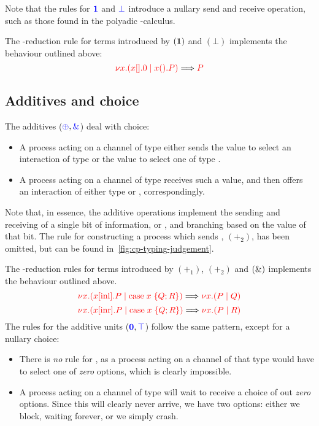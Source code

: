 Note that the rules for $\textcolor{blue}{\mathbf{1}}$ and $\textcolor{blue}{\bot}$ introduce a nullary send and
receive operation, such as those found in the polyadic \textpi-calculus.
\begin{center}
  \cpInfOne
  \cpInfBot
\end{center}
The \textbeta-reduction rule for terms introduced by $(\mathbf{1})$ and $(\bot)$
implements the behaviour outlined above:
\[
  \textcolor{red}{\nu x.(x[].0 \mid x().P)}
  \Longrightarrow
  \textcolor{red}{P}
\]

\subsection{Additives and choice}\label{sec:cp-choice}
The additives ($\textcolor{blue}{\oplus}, \textcolor{blue}{\mathbin{\text{\&}}}$) deal with choice:
\begin{itemize}
\item
  A process acting on a channel of type  either sends the value
   to select an interaction of type  or the value  to
  select one of type .
\item
  A process acting on a channel of type  receives such a value,
  and then offers an interaction of either type  or ,
  correspondingly.
\end{itemize}
Note that, in essence, the additive operations implement the sending and
receiving of a single bit of information,  or , and branching
based on the value of that bit.
The rule for constructing a process which sends , $(\plus_2)$, has been
omitted, but can be found in~\cref{fig:cp-typing-judgement}.
\begin{center}
  \cpInfWith
\end{center}
The \textbeta-reduction rules for terms introduced by $(\plus_1)$, $(\plus_2)$
and $(\mathbin{\text{\&}})$ implements the behaviour outlined above.
\[
  \textcolor{red}{\nu x.(x[\text{inl}].P \mid \text{case}\;x\;\{Q;R\})}
  \Longrightarrow
  \textcolor{red}{\nu x.(P \mid Q)}
\]
\[
  \textcolor{red}{\nu x.(x[\text{inr}].P \mid \text{case}\;x\;\{Q;R\})}
  \Longrightarrow
  \textcolor{red}{\nu x.(P \mid R)}
\]
%
The rules for the additive units ($\textcolor{blue}{\mathbf{0}}, \textcolor{blue}{\top}$) follow the same
pattern, except for a nullary choice:
\begin{itemize}
\item
  There is \emph{no} rule for \ty{\nil}, as a process acting on a channel of
  that type would have to select one of \emph{zero} options, which is clearly
  impossible.
\item
  A process acting on a channel of type \ty{\top} will wait to receive a choice
  of out \emph{zero} options. Since this will clearly never arrive, we have two
  options: either we block, waiting forever, or we simply crash.
\end{itemize}
